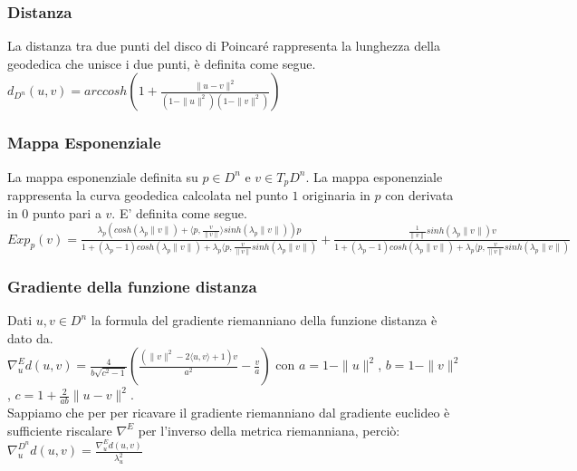 \documentclass[a4paper, 12pt]{article}
\begin{document}
\subsubsection{Distanza}
La distanza tra due punti del disco di Poincaré rappresenta la lunghezza della geodedica che unisce i due punti, è definita come segue.\\
$d_{D^n}(u, v) = arccosh(1 + \frac{\parallel u - v\parallel^2}{(1-\parallel u \parallel^2)(1-\parallel v \parallel^2)})$
\subsubsection{Mappa Esponenziale}
La mappa esponenziale definita su $p \in D^n$ e $v \in T_pD^n$. La mappa esponenziale rappresenta la curva geodedica calcolata nel punto $1$ originaria in $p$ con derivata in $0$ punto pari a $v$. E' definita come segue.\\
$Exp_p(v) = \frac{\lambda_p (cosh(\lambda_p \parallel v \parallel) + \langle p,\frac{v}{\parallel v \parallel} \rangle sinh(\lambda_p \parallel v \parallel))p}{1 + (\lambda_p - 1) cosh(\lambda_p \parallel v \parallel) + \lambda_p \langle p, \frac{v}{\parallel v \parallel} sinh(\lambda_p \parallel v \parallel)} + \frac{\frac{1}{\parallel v \parallel} sinh(\lambda_p \parallel v \parallel) v}{1 + (\lambda_p - 1) cosh(\lambda_p \parallel v \parallel) + \lambda_p \langle p, \frac{v}{\parallel v \parallel} sinh(\lambda_p \parallel v \parallel)}$
\subsubsection{Gradiente della funzione distanza}
Dati $u,v \in D^n$ la formula del gradiente riemanniano della funzione distanza è dato da.\\
$\nabla_u^{E} d(u,v) = \frac{4}{b \sqrt{c^2 - 1}} (\frac{(\parallel v \parallel^2 - 2\langle u,v \rangle + 1)v}{a^2} - \frac{v}{a})$ con $a = 1 - \parallel u \parallel^2$, $b = 1 - \parallel v \parallel^2$, $c = 1 + \frac{2}{ab} \parallel u - v \parallel^2$.\\
Sappiamo che per per ricavare il gradiente riemanniano dal gradiente euclideo è sufficiente riscalare $\nabla^E$ per l'inverso della metrica riemanniana, perciò: $\nabla_u^{D^n} d(u,v) = \frac{\nabla_u^{E} d(u,v)}{\lambda_u^2}$
\end{document}
